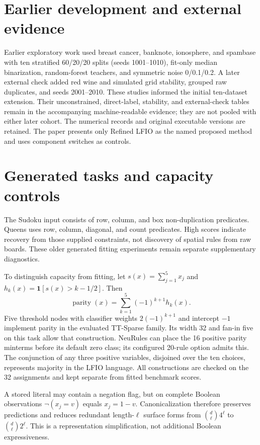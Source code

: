\documentclass[a4paper,fleqn,review]{cas-sc}
\newcommand{\kbsbarrier}{\FloatBarrier}
\newcommand{\kbsbarrier}{}
\begin{document}
\section{Earlier development and external evidence}\label{app:development}
Earlier exploratory work used breast cancer, banknote, ionosphere, and spambase with ten stratified 60/20/20 splits (seeds 1001--1010), fit-only median binarization, random-forest teachers, and symmetric noise 0/0.1/0.2. A later external check added red wine and simulated grid stability, grouped raw duplicates, and seeds 2001--2010. These studies informed the initial ten-dataset extension. Their unconstrained, direct-label, stability, and external-check tables remain in the accompanying machine-readable evidence; they are not pooled with either later cohort. The numerical records and original executable versions are retained. The paper presents only Refined LFIO as the named proposed method and uses component switches as controls.
\kbsbarrier

\section{Generated tasks and capacity controls}\label{app:synthetic}
The Sudoku input consists of row, column, and box non-duplication predicates. Queens uses row, column, diagonal, and count predicates. High scores indicate recovery from those supplied constraints, not discovery of spatial rules from raw boards. These older generated fitting experiments remain separate supplementary diagnostics.

To distinguish capacity from fitting, let $s(x)=\sum_{j=1}^5x_j$ and $h_k(x)=\mathbf{1}[s(x)>k-1/2]$. Then
\begin{equation}
 \operatorname{parity}(x)=\sum_{k=1}^5(-1)^{k+1}h_k(x).
\end{equation}
Five threshold nodes with classifier weights $2(-1)^{k+1}$ and intercept $-1$ implement parity in the evaluated TT-Sparse family. Its width 32 and fan-in five on this task allow that construction. NeuRules can place the 16 positive parity minterms before its default zero class; its configured 20-rule option admits this. The conjunction of any three positive variables, disjoined over the ten choices, represents majority in the LFIO language. All constructions are checked on the 32 assignments and kept separate from fitted benchmark scores.

A stored literal may contain a negation flag, but on complete Boolean observations $\neg(x_j=v)$ equals $x_j=1-v$. Canonicalization therefore preserves predictions and reduces redundant length-$\ell$ surface forms from $\binom d\ell4^\ell$ to $\binom d\ell2^\ell$. This is a representation simplification, not additional Boolean expressiveness.
\kbsbarrier
\end{document}
